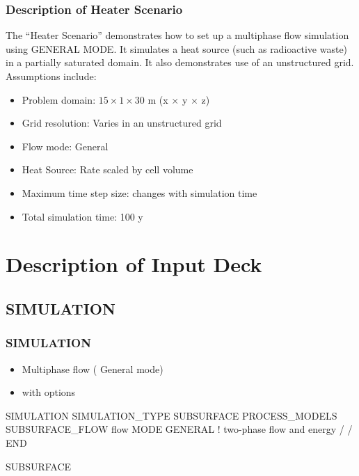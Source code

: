 \documentclass{beamer}
\newcommand\redcomment[1]{{{\color{red} #1}}}
\newcommand\bluecomment[1]{{{\color{blue} #1}}}
\begin{document}
\begin{frame}\frametitle{Description of Heater Scenario}
The ``Heater Scenario'' demonstrates how to set up a multiphase flow simulation using \redcomment{GENERAL MODE}. It simulates a heat source (such as radioactive waste) in a partially saturated domain. It also demonstrates use of an \redcomment{unstructured grid}. Assumptions include:
\begin{itemize}
  \item Problem domain: $15 \times 1 \times 30$ m (x $\times$ y $\times$ z)
  \item Grid resolution: Varies in an unstructured grid
  \item Flow mode: General
  \item Heat Source: Rate scaled by cell volume
  \item Maximum time step size: changes with simulation time
  \item Total simulation time: 100 y
\end{itemize}

\end{frame}




\section{Description of Input Deck}

\subsection{SIMULATION}

\begin{frame}[fragile]\frametitle{SIMULATION}

\begin{itemize}
  \item Multiphase flow (\redcomment{General mode})
  \item with \redcomment{options}
\end{itemize}

\begin{semiverbatim}\small
SIMULATION
  SIMULATION_TYPE SUBSURFACE
  PROCESS_MODELS
    SUBSURFACE_FLOW flow
      MODE GENERAL \bluecomment{! two-phase flow and energy} 
    /   
  /
END

SUBSURFACE
\end{semiverbatim}

\end{frame}
\end{document}

